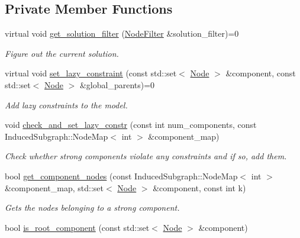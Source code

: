 \subsection*{Private Member Functions}
\begin{DoxyCompactItemize}
\item 
virtual void \hyperlink{classderegnet_1_1LazyConstraintCallback_aebc9854e98523c99d3f856ff71bb86fb}{get\+\_\+solution\+\_\+filter} (\hyperlink{namespacederegnet_a50db1f8fc7c6a954d825d9e1ed9ad302}{Node\+Filter} \&solution\+\_\+filter)=0
\begin{DoxyCompactList}\small\item\em Figure out the current solution. \end{DoxyCompactList}\item 
virtual void \hyperlink{classderegnet_1_1LazyConstraintCallback_a8f6db7da84271afcd2e2169318569558}{set\+\_\+lazy\+\_\+constraint} (const std\+::set$<$ \hyperlink{namespacederegnet_a744bad34f2de9856d36715a445f027f3}{Node} $>$ \&component, const std\+::set$<$ \hyperlink{namespacederegnet_a744bad34f2de9856d36715a445f027f3}{Node} $>$ \&global\+\_\+parents)=0
\begin{DoxyCompactList}\small\item\em Add lazy constraints to the model. \end{DoxyCompactList}\item 
void \hyperlink{classderegnet_1_1LazyConstraintCallback_a02eb39d4ea843597aa7c3382f17af874}{check\+\_\+and\+\_\+set\+\_\+lazy\+\_\+constr} (const int num\+\_\+components, const Induced\+Subgraph\+::\+Node\+Map$<$ int $>$ \&component\+\_\+map)
\begin{DoxyCompactList}\small\item\em Check whether strong components violate any constraints and if so, add them. \end{DoxyCompactList}\item 
bool \hyperlink{classderegnet_1_1LazyConstraintCallback_a9ebed5d496c64603628b8655dd538839}{get\+\_\+component\+\_\+nodes} (const Induced\+Subgraph\+::\+Node\+Map$<$ int $>$ \&component\+\_\+map, std\+::set$<$ \hyperlink{namespacederegnet_a744bad34f2de9856d36715a445f027f3}{Node} $>$ \&component, const int k)
\begin{DoxyCompactList}\small\item\em Gets the nodes belonging to a strong component. \end{DoxyCompactList}\item 
bool \hyperlink{classderegnet_1_1LazyConstraintCallback_a3eb6c682c8e1129036f1218513d6feb0}{is\+\_\+root\+\_\+component} (const std\+::set$<$ \hyperlink{namespacederegnet_a744bad34f2de9856d36715a445f027f3}{Node} $>$ \&component)

\end{DoxyCompactItemize}

